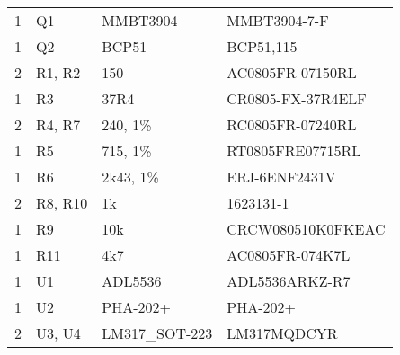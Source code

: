 \begin{center}
\begin{tabular}{@{} llll @{}}
        1   & Q1                        & MMBT3904                    & MMBT3904-7-F       \\
        1   & Q2                        & BCP51                       & BCP51,115          \\
        2   & R1, R2                    & 150                         & AC0805FR-07150RL   \\
        1   & R3                        & 37R4                        & CR0805-FX-37R4ELF  \\
        2   & R4, R7                    & 240, 1\%                    & RC0805FR-07240RL   \\
        1   & R5                        & 715, 1\%                    & RT0805FRE07715RL   \\
        1   & R6                        & 2k43, 1\%                   & ERJ-6ENF2431V      \\
        2   & R8, R10                   & 1k                          & 1623131-1          \\
        1   & R9                        & 10k                         & CRCW080510K0FKEAC  \\
        1   & R11                       & 4k7                         & AC0805FR-074K7L    \\
        1   & U1                        & ADL5536                     & ADL5536ARKZ-R7     \\
        1   & U2                        & PHA-202+                    & PHA-202+           \\
        2   & U3, U4                    & LM317\_SOT-223              & LM317MQDCYR        \\
        \bottomrule
    \end{tabular}
\end{center}


\newpage
